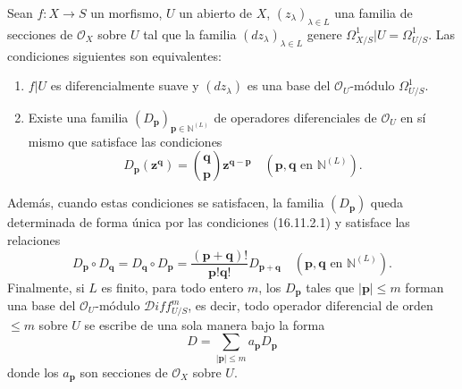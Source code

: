 \begin{theorem}[16.11.2]
\label{IV.16.11.2}
Sean $f:X\to S$ un morfismo, $U$ un abierto de $X$,
$(z_\lambda)_{\lambda\in L}$ una familia de secciones de $\mathcal{O}_X$
sobre $U$ tal que la familia $(dz_\lambda)_{\lambda\in L}$ genere
$\varOmega_{X/S}^1|U=\varOmega_{U/S}^1$. Las condiciones siguientes son
equivalentes:
\begin{enumerate}
  \item[\textup{a)}] $f|U$ es diferencialmente suave y $(dz_\lambda)$ es una base
  del $\mathcal{O}_U$-módulo $\varOmega_{U/S}^1$.
  \item[\textup{b)}] Existe una familia
  $(D_{\mathbf{p}})_{\mathbf{p}\in\mathbb{N}^{(L)}}$ de operadores
  diferenciales de $\mathcal{O}_U$ en sí mismo que satisface las condiciones
  \[
    D_{\mathbf{p}}(\mathbf{z}^{\mathbf{q}})
    =\binom{\mathbf{q}}{\mathbf{p}}
      \mathbf{z}^{\mathbf{q}-\mathbf{p}}
    \quad(\mathbf{p},\mathbf{q}\text{ en }\mathbb{N}^{(L)}).
    \tag{16.11.2.1}
    \label{IV.16.11.2.1}
  \]
\end{enumerate}
Además, cuando estas condiciones se satisfacen, la familia
$(D_{\mathbf{p}})$ queda determinada de forma única por las condiciones
\textup{(16.11.2.1)} y satisface las relaciones
\[
  D_{\mathbf{p}}\circ D_{\mathbf{q}}
  =D_{\mathbf{q}}\circ D_{\mathbf{p}}
  =\frac{(\mathbf{p}+\mathbf{q})!}{\mathbf{p}!\mathbf{q}!}
    D_{\mathbf{p}+\mathbf{q}}
  \quad(\mathbf{p},\mathbf{q}\text{ en }\mathbb{N}^{(L)}).
  \tag{16.11.2.2}
  \label{IV.16.11.2.2}
\]
Finalmente, si $L$ es finito, para todo entero $m$, los $D_{\mathbf{p}}$ tales que
$|\mathbf{p}|\leq m$ forman una base del $\mathcal{O}_U$-módulo
$\mathscr{D}\!iff_{U/S}^m$, es decir, todo operador diferencial
de orden $\leq m$ sobre $U$ se escribe de una sola manera bajo la forma
\[
  D=\sum_{|\mathbf{p}|\leq m}a_{\mathbf{p}}D_{\mathbf{p}}
\]
donde los $a_{\mathbf{p}}$ son secciones de $\mathcal{O}_X$ sobre
$U$.
\end{theorem}

